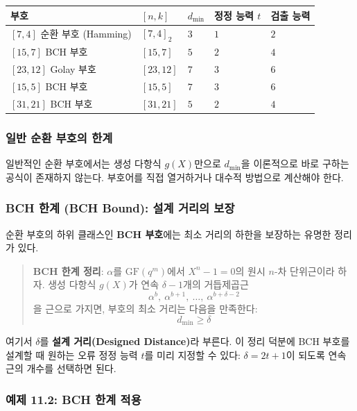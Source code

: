 \documentclass[
  oneside]{article}
\begin{document}
\begin{longtable}[]{@{}lllll@{}}
\toprule\noalign{}
부호 & \([n, k]\) & \(d_{\min}\) & 정정 능력 \(t\) & 검출 능력 \\
\midrule\noalign{}
\endhead
\bottomrule\noalign{}
\endlastfoot
\([7, 4]\) 순환 부호 (Hamming) & \([7, 4]_2\) & \(3\) & \(1\) & \(2\) \\
\([15, 7]\) BCH 부호 & \([15, 7]\) & \(5\) & \(2\) & \(4\) \\
\([23, 12]\) Golay 부호 & \([23, 12]\) & \(7\) & \(3\) & \(6\) \\
\([15, 5]\) BCH 부호 & \([15, 5]\) & \(7\) & \(3\) & \(6\) \\
\([31, 21]\) BCH 부호 & \([31, 21]\) & \(5\) & \(2\) & \(4\) \\
\end{longtable}

\subsubsection{일반 순환 부호의
한계}\label{uxc77cuxbc18-uxc21cuxd658-uxbd80uxd638uxc758-uxd55cuxacc4}

일반적인 순환 부호에서는 생성 다항식 \(g(X)\)만으로 \(d_{\min}\)을
이론적으로 바로 구하는 공식이 존재하지 않는다. 부호어를 직접 열거하거나
대수적 방법으로 계산해야 한다.

\subsubsection{BCH 한계 (BCH Bound): 설계 거리의
보장}\label{bch-uxd55cuxacc4-bch-bound-uxc124uxacc4-uxac70uxb9acuxc758-uxbcf4uxc7a5}

순환 부호의 하위 클래스인 \textbf{BCH 부호}에는 최소 거리의 하한을
보장하는 유명한 정리가 있다.

\begin{quote}
\textbf{BCH 한계 정리}: \(\alpha\)를 \(\text{GF}(q^m)\)에서
\(X^n - 1 = 0\)의 원시 \(n\)-차 단위근이라 하자. 생성 다항식 \(g(X)\)가
연속 \(\delta - 1\)개의 거듭제곱근
\[\alpha^b,\ \alpha^{b+1},\ \dots,\ \alpha^{b+\delta-2}\] 을 근으로
가지면, 부호의 최소 거리는 다음을 만족한다: \[d_{\min} \geq \delta\]
\end{quote}

여기서 \(\delta\)를 \textbf{설계 거리(Designed Distance)}라 부른다. 이
정리 덕분에 BCH 부호를 설계할 때 원하는 오류 정정 능력 \(t\)를 미리
지정할 수 있다: \(\delta = 2t + 1\)이 되도록 연속근의 개수를 선택하면
된다.

\subsubsection{예제 11.2: BCH 한계
적용}\label{uxc608uxc81c-11.2-bch-uxd55cuxacc4-uxc801uxc6a9}
\end{document}
